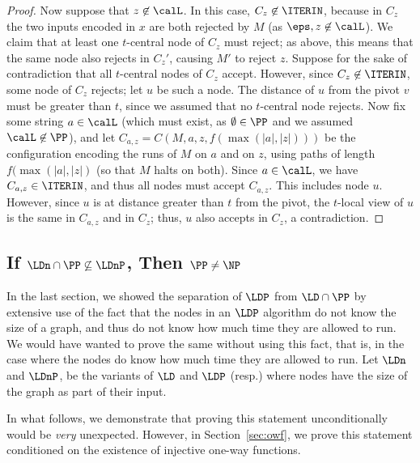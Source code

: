 \begin{proof}
Now suppose that $z \not \in \calL$.
In this case, $C_z \not \in \ITERIN$,
because in $C_z$ the two inputs encoded in $x$ are both rejected by $M$ (as $\eps, z \not \in \calL$).
We claim that at least one $t$-central node of $C_z$ must reject;
as above, this means that the same node also rejects in $C_z'$,
causing $M'$ to reject $z$.
Suppose for the sake of contradiction that all $t$-central nodes of $C_z$ accept.
However, since $C_z \not \in \ITERIN$, some node of $C_z$ rejects;
let $u$ be such a node.
The distance of $u$ from the pivot $v$ must be greater than $t$, since we assumed that no $t$-central node rejects.
Now fix some string $a \in \calL$ (which must exist, as $\emptyset \in \PP$ and we assumed $\calL \not \in \PP$),
and let $C_{a,z} = C(M,a,z,f(\max(|a|,|z|)))$
be the configuration encoding the runs of $M$ on $a$ and on $z$, using paths of length $f(\max(|a|,|z|)$
(so that $M$ halts on both).
Since $a \in \calL$,
we have $C_{a,z} \in \ITERIN$,
and thus all nodes must accept $C_{a,z}$.
This includes node $u$.
However, since $u$ is at distance greater than $t$ from the pivot,
the $t$-local view of $u$ is the same in $C_{a,z}$ and in $C_z$;
thus, $u$ also accepts in $C_z$, a contradiction.
\end{proof}










\subsection{If $\LDn \cap \PP \not \subseteq \LDnP$, Then $\PP \neq \NP$}
In the last section, we showed the separation of $\LDP$ from $\LD\cap \PP$ by extensive use of the fact that the nodes in an $\LDP$ algorithm do not know the size of a graph, and thus do not know how much time they are allowed to run. We would have wanted to prove the same without using this fact, that is, in the case where the nodes do know how much time they are allowed to run. Let $\LDn$ and $\LDnP$, be the variants of $\LD$ and $\LDP$ (resp.) where nodes have the size of the graph as part of their input.

In what follows, we demonstrate that proving this statement unconditionally would be \emph{very} unexpected. However, in Section~\ref{sec:owf}, we prove this statement conditioned on the existence of injective one-way functions.


